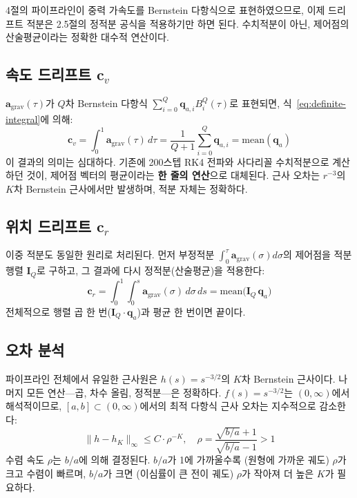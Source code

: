 \documentclass[11pt]{article}
\begin{document}
4절의 파이프라인이 중력 가속도를 Bernstein 다항식으로 표현하였으므로,
이제 드리프트 적분은 2.5절의 정적분 공식을 적용하기만 하면 된다.
수치적분이 아닌, 제어점의 산술평균이라는 정확한 대수적 연산이다.

\subsection{속도 드리프트 $\mathbf{c}_v$}

$\mathbf{a}_\mathrm{grav}(\tau)$가 $Q$차 Bernstein 다항식
$\sum_{i=0}^Q \mathbf{q}_{a,i} B_i^Q(\tau)$로 표현되면,
식~\eqref{eq:definite-integral}에 의해:
\begin{equation}
  \mathbf{c}_v = \int_0^1 \mathbf{a}_\mathrm{grav}(\tau)\,d\tau
  = \frac{1}{Q+1}\sum_{i=0}^Q \mathbf{q}_{a,i}
  = \mathrm{mean}(\mathbf{q}_a)
  \label{eq:cv-algebraic}
\end{equation}
이 결과의 의미는 심대하다.
기존에 200스텝 RK4 전파와 사다리꼴 수치적분으로 계산하던 것이,
제어점 벡터의 평균이라는 \textbf{한 줄의 연산}으로 대체된다.
근사 오차는 $r^{-3}$의 $K$차 Bernstein 근사에서만 발생하며,
적분 자체는 정확하다.

\subsection{위치 드리프트 $\mathbf{c}_r$}

이중 적분도 동일한 원리로 처리된다.
먼저 부정적분 $\int_0^\tau \mathbf{a}_\mathrm{grav}(\sigma) d\sigma$의
제어점을 적분 행렬 $\mathbf{I}_Q$로 구하고,
그 결과에 다시 정적분(산술평균)을 적용한다:
\begin{equation}
  \mathbf{c}_r = \int_0^1\!\int_0^s \mathbf{a}_\mathrm{grav}(\sigma)\,d\sigma\,ds
  = \mathrm{mean}\bigl(\mathbf{I}_Q \, \mathbf{q}_a\bigr)
  \label{eq:cr-algebraic}
\end{equation}
전체적으로 행렬 곱 한 번($\mathbf{I}_Q \cdot \mathbf{q}_a$)과
평균 한 번이면 끝이다.

\subsection{오차 분석}

파이프라인 전체에서 유일한 근사원은 $h(s) = s^{-3/2}$의 $K$차 Bernstein 근사이다.
나머지 모든 연산---곱, 차수 올림, 정적분---은 정확하다.
$f(s) = s^{-3/2}$는 $(0, \infty)$에서 해석적이므로,
$[a, b] \subset (0, \infty)$에서의 최적 다항식 근사 오차는 지수적으로 감소한다:
\begin{equation}
  \|h - h_K\|_\infty \leq C \cdot \rho^{-K}, \quad
  \rho = \frac{\sqrt{b/a} + 1}{\sqrt{b/a} - 1} > 1
  \label{eq:rho-bound}
\end{equation}
수렴 속도 $\rho$는 $b/a$에 의해 결정된다.
$b/a$가 1에 가까울수록 (원형에 가까운 궤도) $\rho$가 크고 수렴이 빠르며,
$b/a$가 크면 (이심률이 큰 전이 궤도) $\rho$가 작아져 더 높은 $K$가 필요하다.
\end{document}
